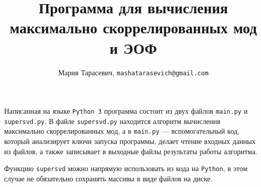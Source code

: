 \documentclass[12pt, a4paper]{article}
\title{\large Программа для вычисления максимально скоррелированных мод и ЭОФ}
\author{Мария Тарасевич, \texttt{mashatarasevich@gmail.com}}
\date{}
\begin{document}
\maketitle
	
	
Написанная на языке \texttt{Python 3} программа состоит из двух файлов \texttt{main.py} и \texttt{supersvd.py}. В файле \texttt{supersvd.py} находится алгоритм вычисления максимально скоррелированных мод, а в \texttt{main.py} --- вспомогательный код, который анализирует ключи запуска программы, делает чтение входных данных из файлов, а также записывает в выходные файлы результаты работы алгоритма.

Функцию \texttt{supersvd} можно напрямую использовать из кода на \texttt{Python}, в этом случае не обязательно сохранять массивы в виде файлов на диске. 
 



\end{document}
